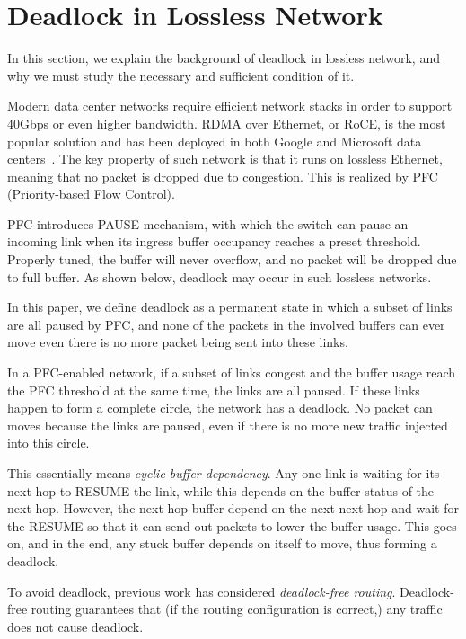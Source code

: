\section{Deadlock in Lossless Network}

In this section, we explain the background of deadlock in lossless network, and 
why we must study the necessary and sufficient condition of it.

Modern data center networks require efficient network stacks in order to support 
40Gbps or even higher bandwidth. RDMA over Ethernet, or RoCE, is the most popular
solution and has been deployed in both Google and Microsoft data centers~\cite{dcqcn, timely}.
The key property of such network is that it runs on lossless Ethernet, meaning
that no packet is dropped due to congestion. This is realized by PFC 
(Priority-based Flow Control).

PFC introduces PAUSE mechanism, with which the switch can pause an incoming link
when its ingress buffer occupancy reaches a preset threshold. Properly tuned, the 
buffer will never overflow, and no packet will be dropped due to full buffer.
As shown below, deadlock may occur in such lossless networks.


In this paper, we define deadlock as a permanent state in which a subset of links are all paused
by PFC, and none of the packets in the involved buffers can ever move even there is 
no more packet being sent into these links.

In a PFC-enabled network, if a subset of links congest and the buffer usage reach
the PFC threshold at the same time, the links are all paused. If these links happen
to form a complete circle, the network has a deadlock. No packet can moves because 
the links are paused, even if there is no more new traffic injected into this circle.

This essentially means {\em cyclic buffer dependency}. Any one link is waiting for its next
hop to RESUME the link, while this depends on the buffer status of the next hop. However,
the next hop buffer depend on the next next hop and wait for the RESUME
so that it can send out packets to lower the buffer usage. This goes on, and in the end, 
any stuck buffer depends on itself to move, thus forming a deadlock.

To avoid deadlock, previous work has considered {\em deadlock-free routing}. Deadlock-free
routing guarantees that (if the routing configuration is correct,) any traffic does not
cause deadlock.

